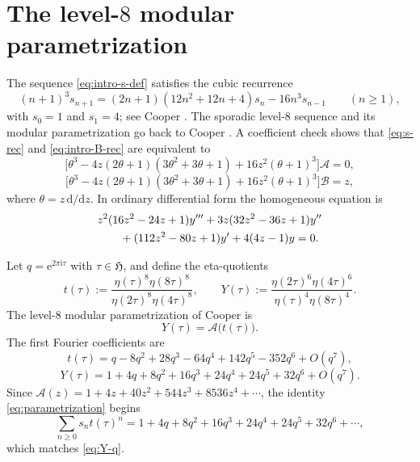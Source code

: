 \documentclass[11pt]{amsart}
\numberwithin{equation}{section}
\theoremstyle{plain}
\theoremstyle{definition}
\theoremstyle{remark}
\newcommand{\Hh}{\mathfrak{H}}
\newcommand{\dd}{\mathrm{d}}
\newcommand{\ii}{\mathrm{i}}
\newcommand{\e}{\mathrm{e}}
\newcommand{\etaf}{\eta}
\newcommand{\thet}{\theta}
\begin{document}
\section{The level-\texorpdfstring{$8$}{8} modular parametrization}\label{sec:param}

The sequence \eqref{eq:intro-s-def} satisfies the cubic recurrence
\begin{equation}\label{eq:s-rec}
(n+1)^3s_{n+1}=(2n+1)(12n^2+12n+4)s_n-16n^3s_{n-1}
\qquad(n\ge 1),
\end{equation}
with $s_0=1$ and $s_1=4$; see Cooper \cite[Table~2, level $8$]{Cooper2023}. The sporadic level-$8$ sequence and its modular parametrization go back to Cooper \cite{Cooper2012}. A coefficient check shows that \eqref{eq:s-rec} and \eqref{eq:intro-B-rec} are equivalent to
\begin{equation}\label{eq:theta-ode}
\bigl[\thet^3-4z(2\thet+1)(3\thet^2+3\thet+1)+16z^2(\thet+1)^3\bigr]\mathcal A=0,
\end{equation}
\begin{equation}\label{eq:theta-inhom}
\bigl[\thet^3-4z(2\thet+1)(3\thet^2+3\thet+1)+16z^2(\thet+1)^3\bigr]\mathcal B=z,
\end{equation}
where $\thet=z\,\dd/\dd z$. In ordinary differential form the homogeneous equation is
\begin{align}
&z^2(16z^2-24z+1)y'''+3z(32z^2-36z+1)y'' \notag\\
&\qquad +(112z^2-80z+1)y'+4(4z-1)y=0.
\label{eq:ordinary-ode}
\end{align}

Let $q=\e^{2\pi\ii\tau}$ with $\tau\in\Hh$, and define the eta-quotients
\begin{equation}\label{eq:t-Y-def}
t(\tau):=\frac{\etaf(\tau)^8\etaf(8\tau)^8}{\etaf(2\tau)^8\etaf(4\tau)^8},
\qquad
Y(\tau):=\frac{\etaf(2\tau)^6\etaf(4\tau)^6}{\etaf(\tau)^4\etaf(8\tau)^4}.
\end{equation}
The level-$8$ modular parametrization of Cooper is
\begin{equation}\label{eq:parametrization}
Y(\tau)=\mathcal A\bigl(t(\tau)\bigr).
\end{equation}
The first Fourier coefficients are
\begin{equation}\label{eq:t-q}
t(\tau)=q-8q^2+28q^3-64q^4+142q^5-352q^6+O(q^7),
\end{equation}
\begin{equation}\label{eq:Y-q}
Y(\tau)=1+4q+8q^2+16q^3+24q^4+24q^5+32q^6+O(q^7).
\end{equation}
Since $\mathcal A(z)=1+4z+40z^2+544z^3+8536z^4+\cdots$, the identity \eqref{eq:parametrization} begins
\[
\sum_{n\ge 0}s_n t(\tau)^n=1+4q+8q^2+16q^3+24q^4+24q^5+32q^6+\cdots,
\]
which matches \eqref{eq:Y-q}.
\end{document}

